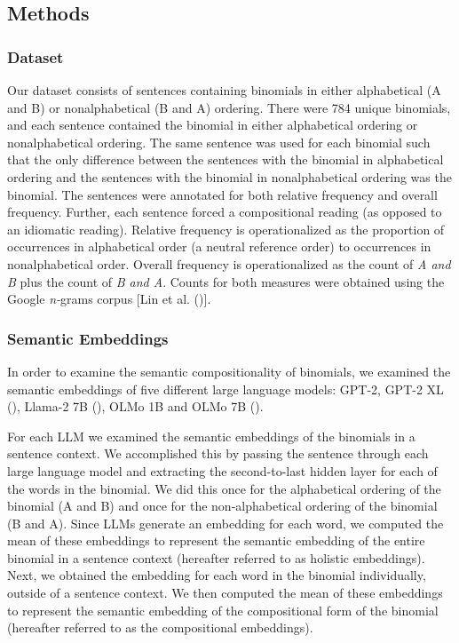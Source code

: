 \documentclass[
  12pt,
  letterpaper,
]{scrreport}
\begin{document}
\subsection{Methods}\label{methods-8}

\subsubsection{Dataset}\label{dataset-1}

Our dataset consists of sentences containing binomials in either
alphabetical (A and B) or nonalphabetical (B and A) ordering. There were
784 unique binomials, and each sentence contained the binomial in either
alphabetical ordering or nonalphabetical ordering. The same sentence was
used for each binomial such that the only difference between the
sentences with the binomial in alphabetical ordering and the sentences
with the binomial in nonalphabetical ordering was the binomial. The
sentences were annotated for both relative frequency and overall
frequency. Further, each sentence forced a compositional reading (as
opposed to an idiomatic reading). Relative frequency is operationalized
as the proportion of occurrences in alphabetical order (a neutral
reference order) to occurrences in nonalphabetical order. Overall
frequency is operationalized as the count of \emph{A and B} plus the
count of \emph{B and A}. Counts for both measures were obtained using
the Google \emph{n-}grams corpus {[}Lin et al.
(){]}.

\subsubsection{Semantic Embeddings}\label{semantic-embeddings}

In order to examine the semantic compositionality of binomials, we
examined the semantic embeddings of five different large language
models: GPT-2, GPT-2 XL
(),
Llama-2 7B (),
OLMo 1B and OLMo 7B
().

For each LLM we examined the semantic embeddings of the binomials in a
sentence context. We accomplished this by passing the sentence through
each large language model and extracting the second-to-last hidden layer
for each of the words in the binomial. We did this once for the
alphabetical ordering of the binomial (A and B) and once for the
non-alphabetical ordering of the binomial (B and A). Since LLMs generate
an embedding for each word, we computed the mean of these embeddings to
represent the semantic embedding of the entire binomial in a sentence
context (hereafter referred to as holistic embeddings). Next, we
obtained the embedding for each word in the binomial individually,
outside of a sentence context. We then computed the mean of these
embeddings to represent the semantic embedding of the compositional form
of the binomial (hereafter referred to as the compositional embeddings).
\end{document}
